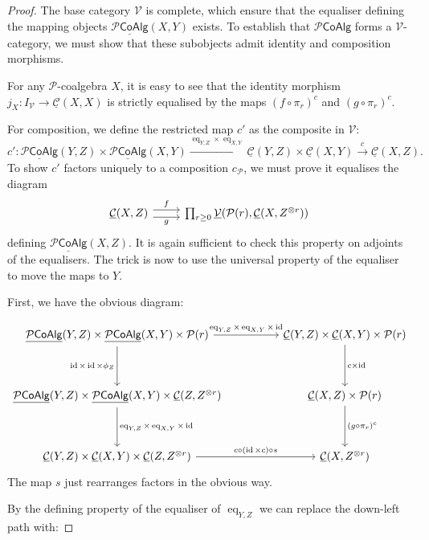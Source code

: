 \documentclass[10pt,a4paper]{amsart}
\newcommand{\C}{\mathcal C}
\def\P{\mathcal P}
\def\Pcoalg{\P\mathsf{CoAlg}}
\newcommand{\V}{\mathcal V}
\newcommand{\eq}{\operatorname{eq}}
\def\id{\operatorname{id}}
\newcommand{\uC}{\underline{\C}}
\newcommand{\uPcoalg}{\underline{\Pcoalg}}
\newcommand{\uV}{\underline{\mathcal V}}
\def\unit{I}
\begin{document}
\begin{proof}
The base category $\V$ is complete, which ensure that the equaliser defining the mapping objects $\uPcoalg(X, Y)$ exists. To establish that $\Pcoalg$ forms a $\V$-category, we must show that these subobjects admit identity and composition morphisms. 

For any $\P$-coalgebra $X$, it is easy to see that the identity morphism $j_X \colon \unit_\V \to \uC(X, X)$ is strictly equalised by the maps $(f\circ \pi_r)^c$ and $(g\circ \pi_r)^c$.

For composition, we define the restricted map $c'$ as the composite in $\V$:
$$ c' \colon \uPcoalg(Y, Z) \times \uPcoalg(X, Y) \xrightarrow{\eq_{Y,Z} \times \eq_{X,Y}} \uC(Y, Z) \times \uC(X, Y) \xrightarrow{c} \uC(X, Z). $$
To show $c'$ factors uniquely to a composition $c_{\P}$, we must prove it equalises the diagram
$$
\begin{tikzcd}
\uC(X, Z) \ar[r,shift left=.75ex,"f"]
  \ar[r,shift right=.75ex,swap,"g"]
&
\prod_{r\geq 0} \uV(\P(r), \uC(X, Z^{\otimes r}) ) 
\end{tikzcd}
$$
defining $\uPcoalg(X, Z)$. It is again sufficient to check this property on adjoints of the equalisers. The trick is now to use the universal property of the equaliser to move the maps to $Y$.

First, we have the obvious diagram:

$$
\begin{tikzcd}[column sep=huge, row sep=huge]
\uPcoalg(Y, Z) \times \uPcoalg(X, Y) \times \P(r)
    \arrow[r, "\eq_{Y,Z} \times \eq_{X,Y} \times \id"]
    \arrow[d, "\id \times \id \times \phi_Z"']
& \uC(Y, Z) \times \uC(X, Y) \times \P(r)
    \arrow[d, "c \times \id"]
\\
\uPcoalg(Y, Z) \times \uPcoalg(X, Y) \times \uC(Z, Z^{\otimes r})
     \arrow[d, "\eq_{Y,Z} \times \eq_{X,Y} \times \id"]
& \uC(X, Z) \times \P(r)
    \arrow[d, "(g \circ \pi_r)^c"] 
\\
\uC(Y, Z) \times \uC(X, Y) \times \uC(Z, Z^{\otimes r}) \arrow[r, "c \circ (\id\times c)\circ s"]
& \uC(X, Z^{\otimes r})
\end{tikzcd}
$$
The map  $s$ just rearranges factors in the obvious way. 


By the defining property of the equaliser of $\eq_{Y,Z}$ we can replace the down-left path with:


\end{proof}
\end{document}
